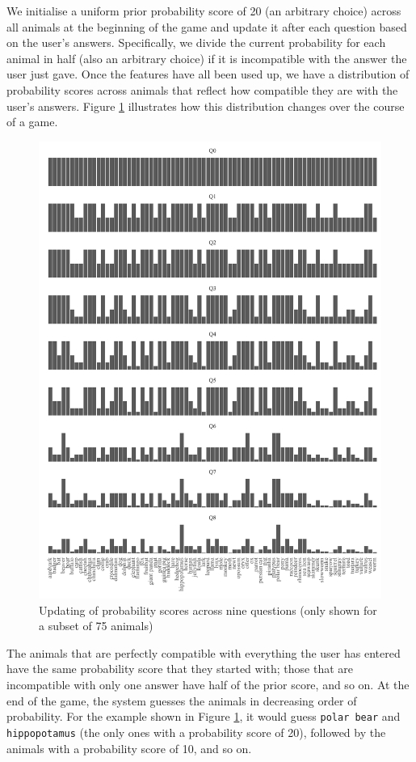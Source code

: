 \documentclass[11pt,a4paper]{article}
\begin{document}
We initialise a uniform prior probability score of 20 (an arbitrary choice) across all animals at the beginning of the game and update it after each question based on the user's answers.
Specifically, we divide the current probability for each animal in half (also an arbitrary choice) if it is incompatible with the answer the user just gave.
Once the features have all been used up, we have a distribution of probability scores across animals that reflect how compatible they are with the user's answers.
Figure \ref{fig:bayesian-update} illustrates how this distribution changes over the course of a game.

\begin{figure}
	\includegraphics[width=\linewidth]{graphics/updating.pdf}
	\caption{Updating of probability scores across nine questions (only shown for a subset of 75 animals)}
	\label{fig:bayesian-update}
\end{figure}

The animals that are perfectly compatible with everything the user has entered have the same probability score that they started with; those that are incompatible with only one answer have half of the prior score, and so on.
At the end of the game, the system guesses the animals in decreasing order of probability.
For the example shown in Figure \ref{fig:bayesian-update}, it would guess \texttt{polar bear} and \texttt{hippopotamus} (the only ones with a probability score of 20), followed by the animals with a probability score of 10, and so on.
\end{document}
